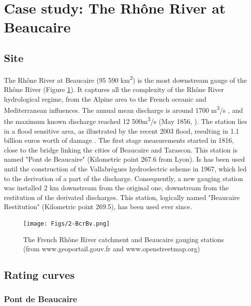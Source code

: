 \documentclass[11pt]{article}
\begin{document}
\section{Case study: The Rhône River at Beaucaire}

    \subsection{Site}
    
    The Rhône River at Beaucaire (95 590 km\textsuperscript{2}) is the most downstream gauge of the Rhône River (Figure \ref{fig:locstations}). It captures all the complexity of the Rhône River hydrological regime, from the Alpine area to the French oceanic and Mediterranean influences. The annual mean discharge is around 1700 m\textsuperscript{3}/s \citep{bard_actualisation_2018}, and the maximum known discharge reached 12 500m\textsuperscript{3}/s (May 1856, \citet{lang_les_2014}). The station lies in a flood sensitive area, as illustrated by the recent 2003 flood, resulting in 1.1 billion euros worth of damage \citep{lang_les_2014}. 
    The first stage measurements started in 1816, close to the bridge linking the cities of Beaucaire and Tarascon. This station is named "Pont de Beaucaire" (Kilometric point 267.6 from Lyon). Is has been used until the construction of the Vallabrègues hydroelectric scheme in 1967, which led to the derivation of a part of the discharge. Consequently, a new gauging station was installed 2 km downstream from the original one, downstream from the restitution of the derivated discharges. This station, logically named "Beaucaire Restitution" (Kilometric point 269.5), has been used ever since.

    \begin{figure}[h]
        \centering
        \texttt{[image: Figs/2-BcrBv.png]}
        \caption{The French Rhône River catchment and Beaucaire gauging stations (from www.geoportail.gouv.fr and www.openstreetmap.org)}
        \label{fig:locstations}
    \end{figure}
    

        \subsection{Rating curves}
        \label{sec:prior_elicitation}
        \subsubsection{Pont de Beaucaire}
        
\end{document}
